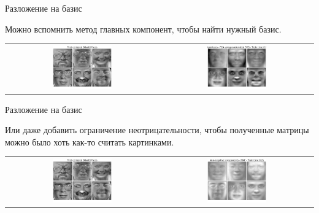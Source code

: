 \begin{frame}{Разложение на базис}

Можно вспомнить  метод главных компонент, чтобы найти нужный базис.

\centering
\begin{tabular}{cc}
    \includegraphics[width=0.4\textwidth]{images/faces/sphx_glr_plot_faces_decomposition_001.png} &
    \includegraphics[width=0.4\textwidth]{images/faces/sphx_glr_plot_faces_decomposition_002.png}
\end{tabular}

\end{frame}

\begin{frame}{Разложение на базис}

Или даже добавить ограничение неотрицательности, чтобы полученные матрицы можно было хоть как-то считать картинками.

\centering
\begin{tabular}{cc}
    \includegraphics[width=0.4\textwidth]{images/faces/sphx_glr_plot_faces_decomposition_001.png} &
    \includegraphics[width=0.4\textwidth]{images/faces/sphx_glr_plot_faces_decomposition_003.png}
\end{tabular}

\end{frame}







